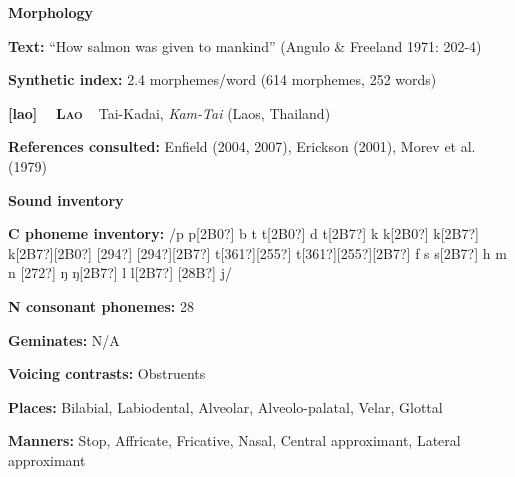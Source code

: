 \begin{styleBody}
\textbf{Morphology}
\end{styleBody}

\begin{styleBody}
\textbf{Text:} “How salmon was given to mankind” (Angulo \& Freeland 1971: 202-4)
\end{styleBody}

\begin{styleBody}
\textbf{Synthetic index: }2.4 morphemes/word (614 morphemes, 252 words)
\end{styleBody}

\clearpage\begin{styleBody}
\textbf{[lao] }\ \ \textbf{\textsc{Lao}}\textbf{\ \ }Tai-Kadai, \textit{Kam-Tai} (Laos, Thailand)
\end{styleBody}

\begin{styleBody}
\textbf{References consulted: }Enfield (2004, 2007), Erickson (2001), Morev et al. (1979)
\end{styleBody}

\begin{styleBody}
\textbf{Sound inventory}
\end{styleBody}

\begin{styleBody}
\textbf{C phoneme inventory:} /p p[2B0?] b t t[2B0?] d t[2B7?] k k[2B0?] k[2B7?] k[2B7?][2B0?] [294?] [294?][2B7?] t[361?][255?] t[361?][255?][2B7?] f s s[2B7?] h m n [272?] ŋ ŋ[2B7?] l l[2B7?] [28B?] j/
\end{styleBody}

\begin{styleBody}
\textbf{N consonant phonemes:} 28
\end{styleBody}

\begin{styleBody}
\textbf{Geminates:} N/A
\end{styleBody}

\begin{styleBody}
\textbf{Voicing contrasts:} Obstruents
\end{styleBody}

\begin{styleBody}
\textbf{Places:} Bilabial, Labiodental, Alveolar, Alveolo-palatal, Velar, Glottal
\end{styleBody}

\begin{styleBody}
\textbf{Manners:} Stop, Affricate, Fricative, Nasal, Central approximant, Lateral approximant
\end{styleBody}

